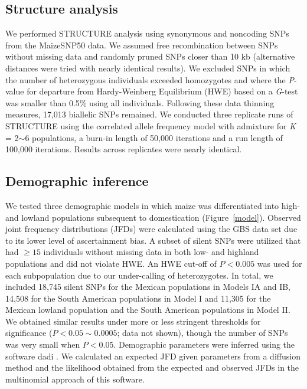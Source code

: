 \subsection*{Structure analysis}
We performed {\sf STRUCTURE} analysis \cite[]{Pritchard_2000_10835412,Falush_2003_12930761} using  synonymous and noncoding SNPs from the MaizeSNP50 data. 
We assumed free recombination between SNPs without missing data and randomly pruned SNPs closer than 10 kb (alternative distances were tried with nearly identical results). 
We excluded SNPs in which the number of heterozygous individuals exceeded homozygotes and where the \emph{P}-value for departure from Hardy-Weinberg Equilibrium (HWE) based on a \emph{G}-test was smaller than 0.5\% using all individuals. 
%
%
Following these data thinning measures, 17,013 biallelic SNPs remained. 
We conducted three replicate runs of {\sf STRUCTURE} using the correlated allele frequency model with admixture for \emph{K} = 2$\sim$6 populations, a burn-in length of 50,000 iterations and a run length of 100,000 iterations. 
Results across replicates were nearly identical.

\subsection*{Demographic inference}
We tested three demographic models in which maize was differentiated into high- and lowland populations subsequent to domestication (Figure~\ref{model}). 
Observed joint frequency distributions (JFDs) were calculated using the GBS data set due to its lower level of ascertainment bias. 
A subset of silent SNPs were utilized that had $\geq15$ individuals without missing data in both low- and highland populations and did not violate HWE.  
An HWE cut-off of $P<0.005$ was used for each subpopulation due to our under-calling of heterozygotes. 
In total, we included 18,745 silent SNPs for the Mexican populations in Models IA and IB, 14,508 for the South American populations in Model I and 11,305 for the Mexican lowland population and the South American populations in Model II.  
We obtained similar results under more or less stringent thresholds for significance ($P < 0.05\sim0.0005$; data not shown), though the number of SNPs was very small when $P<0.05$.  
Demographic parameters were inferred using the software {\sf dadi} \cite[]{Gutenkunst_2009_19851460}.  We calculated an expected JFD given parameters from a diffusion method and the likelihood obtained from the expected and observed JFDs in the multinomial approach of this software. \\
%
%


